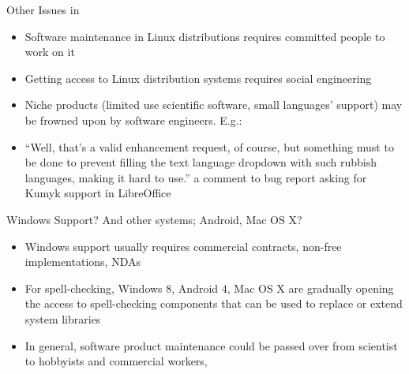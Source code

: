 \documentclass[t,12pt]{beamer}
\begin{document}
\begin{frame}{Other Issues in }
    \begin{itemize}
        \item Software maintenance in Linux distributions requires committed
            people to work on it
        \item Getting access to Linux distribution systems requires social
            engineering
        \item Niche products (limited use scientific software, small
            languages' support) may be frowned upon by software engineers. E.g.:
        \item ``Well, that's a valid enhancement request, of course, but something must to be done to prevent filling the text language dropdown with \alert{such rubbish languages}, making it hard to use.'' a comment to bug report asking for Kumyk
            support in LibreOffice
    \end{itemize}
\end{frame}

\begin{frame}{Windows Support? And other systems; Android, Mac OS X?}
    \begin{itemize}
        \item Windows support usually requires commercial contracts, non-free
            implementations, NDAs
        \item For spell-checking, Windows 8, Android 4, Mac OS X are gradually
            opening the access to spell-checking components that can be used
            to replace or extend system libraries
        \item In general, software product maintenance could be passed over
            from scientist to hobbyists and commercial workers, 
    \end{itemize}
\end{frame}
\end{document}
